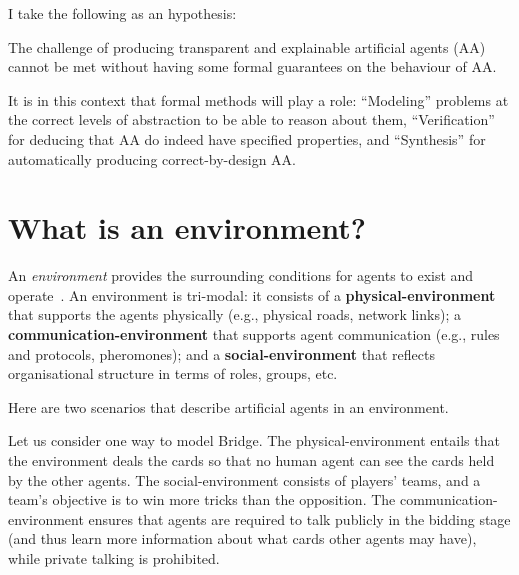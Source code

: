 \documentclass[a4paper,10pt]{article}
\begin{document}
I take the following as an hypothesis:

\begin{framed}
 \noindent The challenge of producing transparent and explainable artificial agents (AA) cannot be met without having some formal guarantees on the behaviour of AA.
\end{framed}
It is in this context that formal methods will play a role: ``Modeling'' problems at the correct levels of abstraction to be able 
to reason about them, ``Verification'' for deducing that AA do indeed have specified properties, and ``Synthesis'' for automatically 
producing correct-by-design AA. 



\section{What is an environment?}

An \emph{environment} provides the surrounding conditions for agents to exist and
operate~\cite{DBLP:conf/aose/OdellPFB02}. An environment is {tri-modal}: it consists of 
a {\bf physical-environment} that supports the agents physically
(e.g., physical roads, network links); a {\bf communication-environment} that
supports agent communication (e.g., rules and protocols, pheromones);
and a {\bf social-environment} that reflects organisational structure in terms of roles, groups,
etc.

Here are two scenarios that describe artificial agents in an environment. 

\begin{example}\label{bridge}
 Let us consider one way to model Bridge. The physical-environment entails that the environment deals the cards so that no human agent can see the cards held 
 by the other agents.
 The social-environment consists of players' teams, and a team's objective is to win more tricks than the opposition. 
 The communication-environment ensures that agents are required to talk publicly in the bidding stage
 (and thus learn more information about what cards other agents may have), while private talking is prohibited.
\end{example}
\end{document}
